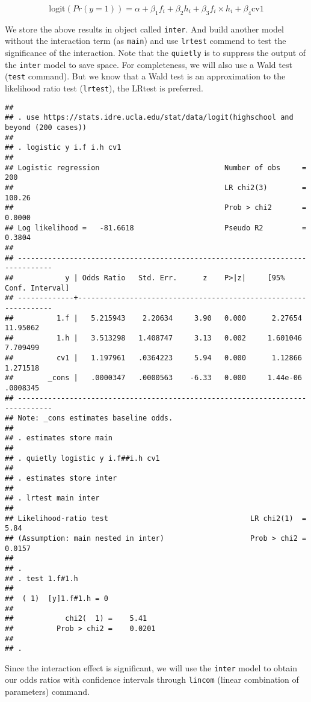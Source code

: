 \documentclass[
]{article}
\begin{document}
\[
\text{logit}(Pr(y = 1)) = \alpha + \beta_1 f_{i} + \beta_2 h_{i} + \beta_3 f_i\times h_i + \beta_4 \text{cv1}
\]

We store the above results in object called \texttt{inter}. And build
another model without the interaction term (as \texttt{main}) and use
\texttt{lrtest} commend to test the significance of the interaction.
Note that the \texttt{quietly} is to suppress the output of the
\texttt{inter} model to save space. For completeness, we will also use a
Wald test (\texttt{test} command). But we know that a Wald test is an
approximation to the likelihood ratio test (\texttt{lrtest}), the LRtest
is preferred.

\begin{verbatim}
## 
## . use https://stats.idre.ucla.edu/stat/data/logit(highschool and beyond (200 cases))
## 
## . logistic y i.f i.h cv1
## 
## Logistic regression                             Number of obs     =        200
##                                                 LR chi2(3)        =     100.26
##                                                 Prob > chi2       =     0.0000
## Log likelihood =   -81.6618                     Pseudo R2         =     0.3804
## 
## ------------------------------------------------------------------------------
##            y | Odds Ratio   Std. Err.      z    P>|z|     [95% Conf. Interval]
## -------------+----------------------------------------------------------------
##          1.f |   5.215943    2.20634     3.90   0.000      2.27654    11.95062
##          1.h |   3.513298   1.408747     3.13   0.002     1.601046    7.709499
##          cv1 |   1.197961   .0364223     5.94   0.000      1.12866    1.271518
##        _cons |   .0000347   .0000563    -6.33   0.000     1.44e-06    .0008345
## ------------------------------------------------------------------------------
## Note: _cons estimates baseline odds.
## 
## . estimates store main
## 
## . quietly logistic y i.f##i.h cv1
## 
## . estimates store inter
## 
## . lrtest main inter 
## 
## Likelihood-ratio test                                 LR chi2(1)  =      5.84
## (Assumption: main nested in inter)                    Prob > chi2 =    0.0157
## 
## . 
## . test 1.f#1.h 
## 
##  ( 1)  [y]1.f#1.h = 0
## 
##            chi2(  1) =    5.41
##          Prob > chi2 =    0.0201
## 
## .
\end{verbatim}

\newpage

Since the interaction effect is significant, we will use the
\texttt{inter} model to obtain our odds ratios with confidence intervals
through \texttt{lincom} (linear combination of parameters) command.
\end{document}
